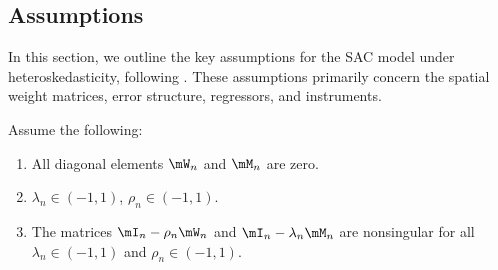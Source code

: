 \documentclass[english,12pt]{book}\usepackage[]{graphicx}\usepackage[]{xcolor}
\begin{document}
% 
% 



% 






\subsection{Assumptions}

In this section, we outline the key assumptions for the SAC model under heteroskedasticity, following \cite{arraiz2010spatial}. These assumptions primarily concern the spatial weight matrices, error structure, regressors, and instruments.

\begin{assumption}\label{assump:w_matri_gmm}
	Assume the following:
	\begin{enumerate}
		\item All diagonal elements $\mW_n$ and $\mM_n$ are zero.
		\item $\lambda_n\in (-1, 1)$, $\rho_n \in (-1, 1)$.
		\item The matrices $\mI_n - \rho_n \mW_n$ and $\mI_n - \lambda_n \mM_n$ are nonsingular for all $\lambda_n\in (-1, 1)$ and $\rho_n \in (-1, 1)$.
	\end{enumerate}
\end{assumption}	
\end{document}
